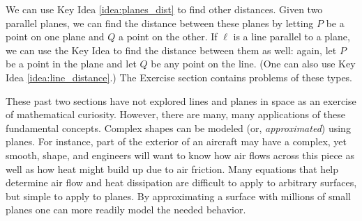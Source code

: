 We can use Key Idea \ref{idea:planes_dist} to find other distances. Given two parallel planes, we can find the distance between these planes by letting $P$ be a point on one plane and $Q$ a point on the other. If $\ell$ is a line parallel to a plane, we can use the Key Idea to find the distance between them as well: again, let $P$ be a point in the plane and let $Q$ be any point on the line. (One can also use Key Idea \ref{idea:line_distance}.) The Exercise section contains problems of these types.

These past two sections have not explored lines and planes in space as an exercise of mathematical curiosity. However, there are many, many applications of these fundamental concepts. Complex shapes can be modeled (or, \textit{approximated}) using planes. For instance, part of the exterior of an aircraft may have a complex, yet smooth, shape, and engineers will want to know how air flows across this piece as well as how heat might build up due to air friction. Many equations that help determine air flow and heat dissipation are difficult to apply to arbitrary surfaces, but simple to apply to planes. By approximating a surface with millions of small planes one can more readily model the needed behavior.

